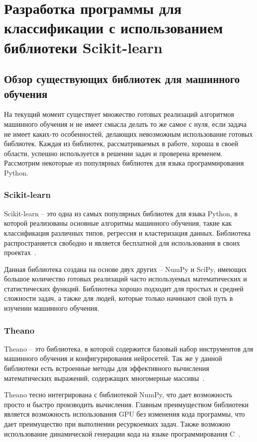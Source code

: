 \newpage
\section{\Large Разработка программы для классификации с использованием библиотеки Scikit-learn}\vspace{-7mm}
\subsection{Обзор существующих библиотек для машинного обучения}
На текущий момент существует множество готовых реализаций алгоритмов машинного обучения и не имеет смысла делать то же самое с нуля, если задача не имеет каких-то особенностей, делающих невозможным использование готовых библиотек. Каждая из библиотек, рассматриваемых в работе, хороша в своей области, успешно используется в решении задач и проверена временем. Рассмотрим некоторые из популярных библиотек для языка программирования Python.
\subsubsection{Scikit-learn}
Scikit-learn -- это одна из самых популярных библиотек для языка Python, в которой реализованы основные алгоритмы машинного обучения, такие как классификация различных типов, регрессия и кластеризация данных. Библиотека распространяется свободно и является бесплатной для использования в своих проектах~\cite{rashka}.
\par
Данная библиотека создана на основе двух других -- NumPy и SciPy, имеющих большое количество готовых реализаций часто используемых математических и статистических функций. Библиотека хорошо подходит для простых и средней сложности задач, а также для людей, которые только начинают свой путь в изучении машинного обучения.
\subsubsection{Theano}
Theano -- это библиотека, в которой содержится базовый набор инструментов для машинного обучения и конфигурирования нейросетей. Так же у данной библиотеки есть встроенные методы для эффективного вычисления математических выражений, содержащих многомерные массивы~\cite{rashka}.
\par
Theano тесно интегрирована с библиотекой NumPy, что дает возможность просто и быстро производить вычисления. Главным преимуществом библиотеки является возможность использования GPU без изменения кода программы, что дает преимущество при выполнении ресуркоемких задач. Также возможно использование динамической генерации кода на языке программирования C~\cite{douson}.
